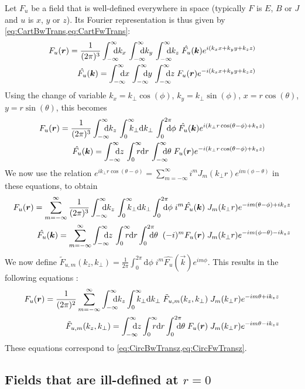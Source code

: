 Let $F_u$ be a field that is well-defined everywhere in space
(typically $F$ is $E$, $B$ or $J$ and $u$ is $x$, $y$ or $z$). Its Fourier representation
is thus given by \cref{eq:CartBwTrans,eq:CartFwTrans}:
\begin{align*}
F_u(\vec{r}) = \frac{1}{(2\pi)^{3}}\Integ{k_x} \,\Integ{k_y}\,
\Integ{k_z} \; \hat{F_u}(\vec{k}) e^{i(k_x x + k_y y + k_z z)} \\
\hat{F_u}(\vec{k})  = \Integ{x} \,\Integ{y}\,
\Integ{z} \; F_u(\vec{r}) e^{-i(k_x x + k_y y + k_z z)} 
\end{align*}
Using the change of variable $k_x=k_\perp\cos(\phi)$, $k_y = k_\perp\sin(\phi)$,
$x=r\cos(\theta)$, $y=r\sin(\theta)$, this becomes
 \begin{align*}
F_u(\vec{r}) = \frac{1}{(2\pi)^{3}}\Integ{k_z} \,\RInteg{k_\perp}\,
\TInteg{\phi} \; \hat{F_u}(\vec{k})
e^{i(k_\perp r \cos(\theta-\phi) + k_z z)} \\
\hat{F_u}(\vec{k})   = \Integ{z} \,\RInteg{r}\,
\Integ{\theta} \; F_u(\vec{r}) e^{-i(k_\perp r \cos(\theta-\phi) + k_z z)} 
\end{align*}
We now use the relation $e^{ik_\perp r\cos(\theta-\phi)} =
\sum_{m=-\infty}^{\infty} i^m J_m(k_\perp r) e^{im(\phi-\theta)}$ in these equations, to obtain
\begin{align*}
F_u (\vec{r})  = \sum_{m=-\infty}^{\infty} \frac{1}{(2\pi)^{3}}\Integ{k_z} \,\RInteg{k_\perp }
\TInteg{\phi} \; i^m \hat{F_u}(\vec{k}) \;
J_m(k_\perp r) e^{-im(\theta-\phi) + ik_z z} \\
\hat{F_u}(\vec{k})   =  \sum_{m=-\infty}^{\infty} \Integ{z} \,\RInteg{r}
\TInteg{\theta} \;\; (-i)^m F_u(\vec{r}) \; J_m(k_\perp r) e^{-im(\phi-\theta) -ik_z z} 
\end{align*}
We now define $\tilde{F}_{u,m}(k_z,k_\perp ) = \frac{1}{2\pi}\int_0^{2\pi}
\mathrm{d}\phi \; i^m \hat{F_u}(\vec{k})
e^{im\phi}$. This results in the following equations :
\begin{align}
F_u(\vec{r}) =  \frac{1}{(2\pi)^2}\sum_{m=-\infty}^{\infty} \Integ{k_z}
\RInteg{k_\perp }\; \tilde{F}_{u,m}(k_z,k_\perp ) \; J_m(k_\perp r) e^{-im\theta + ik_z z} 
\\
\tilde{F}_{u,m}(k_z,k_\perp ) = \Integ{z} \RInteg{r}
\TInteg{\theta} \;F_u(\vec{r})\; J_m(k_\perp r) e^{-im\theta
 - i k_z z} \label{eq:CircBwTransu}
\end{align}
These equations correspond to \cref{eq:CircBwTransz,eq:CircFwTransz}.

\subsection{Fields that are ill-defined at $r=0$}

